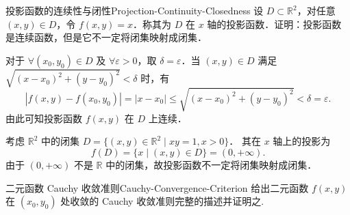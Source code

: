 \begin{problem}{投影函数的连续性与闭性}{Projection-Continuity-Closedness}
    设 $D \subset \mathbb{R}^2$，对任意 $(x, y) \in D$，令 $f(x, y) = x$．称其为 $D$ 在 $x$ 轴的投影函数．证明：投影函数是连续函数，但是它不一定将闭集映射成闭集．
\end{problem}

\begin{myproof}

    对于 $\forall (x_0, y_0) \in D$ 及 $\forall \varepsilon > 0$，取 $\delta = \varepsilon$．当 $(x, y) \in D$ 满足 $\sqrt{(x - x_0)^2 + (y - y_0)^2} < \delta$ 时，有
    \begin{equation}
        |f(x, y) - f(x_0, y_0)| = |x - x_0| \le \sqrt{(x - x_0)^2 + (y - y_0)^2} < \delta = \varepsilon.
    \end{equation}
    由此可知投影函数 $f(x, y)$ 在 $D$ 上连续．


    考虑 $\mathbb{R}^2$ 中的闭集 $D = \{(x, y) \in \mathbb{R}^2 \mid xy = 1, x > 0\}$．
    其在 $x$ 轴上的投影为
    \begin{equation}
        f(D) = \{x \mid (x, y) \in D\} = (0, +\infty).
    \end{equation}
    由于 $(0, +\infty)$ 不是 $\mathbb{R}$ 中的闭集，故投影函数不一定将闭集映射成闭集．
\end{myproof}


\begin{problem}{二元函数 Cauchy 收敛准则}{Cauchy-Convergence-Criterion}
    给出二元函数 $f(x, y)$ 在 $(x_0, y_0)$ 处收敛的 Cauchy 收敛准则完整的描述并证明之.
\end{problem}

